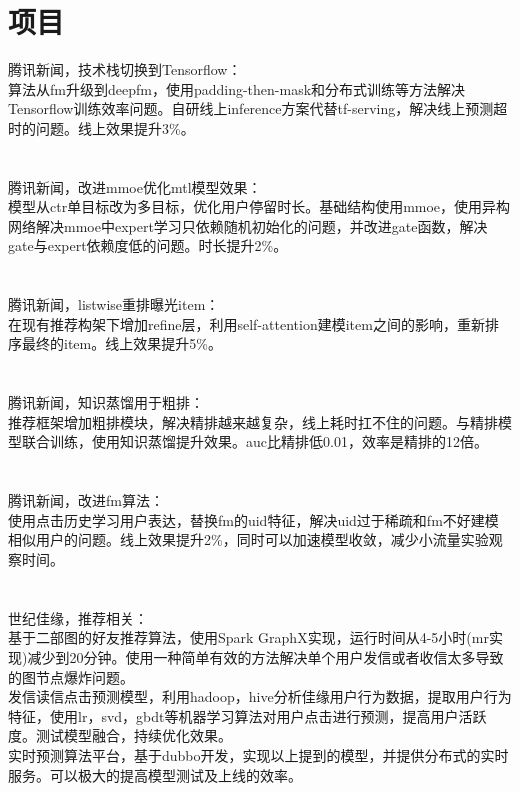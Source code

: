 \documentclass[11pt, a4paper]{article}
\begin{document}
\section*{项目}



腾讯新闻，技术栈切换到Tensorflow： \\
算法从fm升级到deepfm，使用padding-then-mask和分布式训练等方法解决Tensorflow训练效率问题。自研线上inference方案代替tf-serving，解决线上预测超时的问题。线上效果提升3\%。 \\
\\
\\
腾讯新闻，改进mmoe优化mtl模型效果： \\
模型从ctr单目标改为多目标，优化用户停留时长。基础结构使用mmoe，使用异构网络解决mmoe中expert学习只依赖随机初始化的问题，并改进gate函数，解决gate与expert依赖度低的问题。时长提升2\%。 \\
\\
\\
腾讯新闻，listwise重排曝光item： \\
在现有推荐构架下增加refine层，利用self-attention建模item之间的影响，重新排序最终的item。线上效果提升5\%。 \\
\\
\\
腾讯新闻，知识蒸馏用于粗排： \\
推荐框架增加粗排模块，解决精排越来越复杂，线上耗时扛不住的问题。与精排模型联合训练，使用知识蒸馏提升效果。auc比精排低0.01，效率是精排的12倍。 \\
\\
\\
腾讯新闻，改进fm算法： \\
使用点击历史学习用户表达，替换fm的uid特征，解决uid过于稀疏和fm不好建模相似用户的问题。线上效果提升2\%，同时可以加速模型收敛，减少小流量实验观察时间。 \\
\\
\\
世纪佳缘，推荐相关： \\
基于二部图的好友推荐算法，使用Spark GraphX实现，运行时间从4-5小时(mr实现)减少到20分钟。使用一种简单有效的方法解决单个用户发信或者收信太多导致的图节点爆炸问题。 \\
发信读信点击预测模型，利用hadoop，hive分析佳缘用户行为数据，提取用户行为特征，使用lr，svd，gbdt等机器学习算法对用户点击进行预测，提高用户活跃度。测试模型融合，持续优化效果。 \\
实时预测算法平台，基于dubbo开发，实现以上提到的模型，并提供分布式的实时服务。可以极大的提高模型测试及上线的效率。 \\
\end{document}
